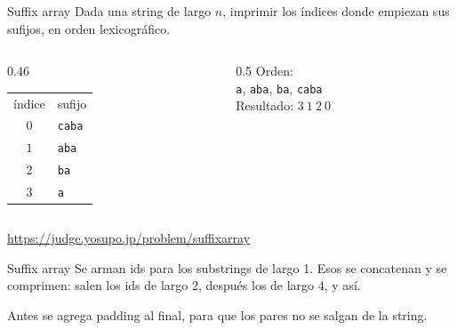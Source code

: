 \begin{frame}{Suffix array}
  Dada una string de largo \(n\), imprimir los índices donde empiezan sus sufijos, en orden lexicográfico.

  \vspace{0.6em}
  \begin{columns}[c,onlytextwidth]
    \begin{column}{0.46\textwidth}
      \centering
      \renewcommand{\arraystretch}{1.2}
      \begin{tabular}{@{}c@{\quad}l@{}}
        índice & sufijo \\
        \(0\) & \texttt{caba} \\
        \(1\) & \texttt{aba} \\
        \(2\) & \texttt{ba} \\
        \(3\) & \texttt{a}
      \end{tabular}
    \end{column}
    \begin{column}{0.5\textwidth}
      Orden:\\[0.3em]
      \texttt{a}, \texttt{aba}, \texttt{ba}, \texttt{caba}\\[0.7em]
      Resultado: \(3\ 1\ 2\ 0\)
    \end{column}
  \end{columns}

  \vspace{0.8em}
  {\footnotesize \url{https://judge.yosupo.jp/problem/suffixarray}}
\end{frame}

\begin{frame}{Suffix array}
  Se arman ids para los substrings de largo 1.
  Esos se concatenan y se comprimen: salen los ids de largo 2, después los de largo 4, y así.

  \medskip
  Antes se agrega padding al final, para que los pares no se salgan de la string.

  \vspace{0.35em}
  \begin{center}
  \end{center}
\end{frame}

